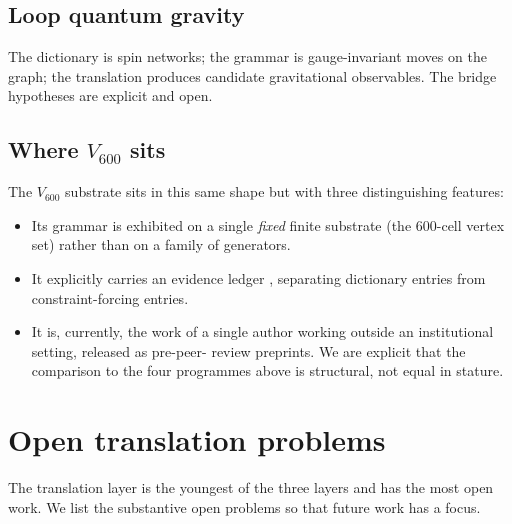 \documentclass[11pt,a4paper]{article}
\begin{document}
\subsection{Loop quantum gravity}

The dictionary is spin networks; the grammar is gauge-invariant
moves on the graph; the translation produces candidate
gravitational observables. The bridge hypotheses are explicit and
open.

\subsection{Where $V_{600}$ sits}

The $V_{600}$ substrate sits in this same shape but with three
distinguishing features:

\begin{itemize}[leftmargin=*]
  \item Its grammar is exhibited on a single \emph{fixed} finite
        substrate (the $600$-cell vertex set) rather than on a
        family of generators.
  \item It explicitly carries an evidence ledger
        \cite{evidenceLedger}, separating dictionary entries from
        constraint-forcing entries.
  \item It is, currently, the work of a single author working
        outside an institutional setting, released as pre-peer-
        review preprints. We are explicit that the comparison to
        the four programmes above is structural, not equal in
        stature.
\end{itemize}

\section{Open translation problems}
\label{sec:openness}

The translation layer is the youngest of the three layers and has
the most open work. We list the substantive open problems so that
future work has a focus.
\end{document}

